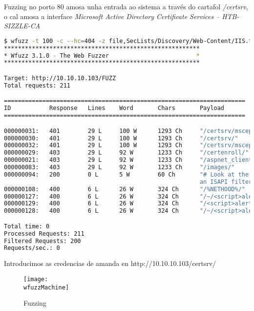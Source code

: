 \documentclass[a4paper]{article}
\newcommand{\wfuzzMachine}{wfuzz_sizzle.png}
\begin{document}
\vspace*{-0.4cm}
        Fuzzing no porto 80 amosa unha entrada ao sistema a través do cartafol \textit{/certsrv}, o cal amosa a interface \textit{Microsoft Active Directory Certificate Services  --  HTB-SIZZLE-CA} 
        \begin{lstlisting}[language=Bash, caption=Fuzzing http]
$ wfuzz -t 100 -c --hc=404 -z file,SecLists/Discovery/Web-Content/IIS.fuzz.txt http://10.10.10.103/FUZZ
********************************************************
* Wfuzz 3.1.0 - The Web Fuzzer                         *
********************************************************

Target: http://10.10.10.103/FUZZ
Total requests: 211

=====================================================================
ID           Response   Lines    Word       Chars       Payload
=====================================================================

000000031:   401        29 L     100 W      1293 Ch     "/certsrv/mscep_admin"
000000030:   401        29 L     100 W      1293 Ch     "/certsrv/"
000000032:   401        29 L     100 W      1293 Ch     "/certsrv/mscep/mscep.dll"
000000029:   403        29 L     92 W       1233 Ch     "/certenroll/"
000000021:   403        29 L     92 W       1233 Ch     "/aspnet_client/"
000000083:   403        29 L     92 W       1233 Ch     "/images/"
000000094:   200        0 L      5 W        60 Ch       "# Look at the result codes in the headers - 403 likely mean the dir exists, 404  means not. It takes
                                                        an ISAPI filter for IIS to return 404's for 403s."
000000108:   400        6 L      26 W       324 Ch      "/%NETHOOD%/"
000000127:   400        6 L      26 W       324 Ch      "/~/<script>alert('XSS')</script>.asp"
000000129:   400        6 L      26 W       324 Ch      "/<script>alert('XSS')</script>.aspx"
000000128:   400        6 L      26 W       324 Ch      "/~/<script>alert('XSS')</script>.aspx"

Total time: 0
Processed Requests: 211
Filtered Requests: 200
Requests/sec.: 0\end{lstlisting}

Introducimos as credencias de amanda en http://10.10.10.103/certsrv/ 
        \begin{figure}[h]
                \centering
                \texttt{[image: \\wfuzzMachine]}
                \caption{Fuzzing}
        \end{figure}
\end{document}

